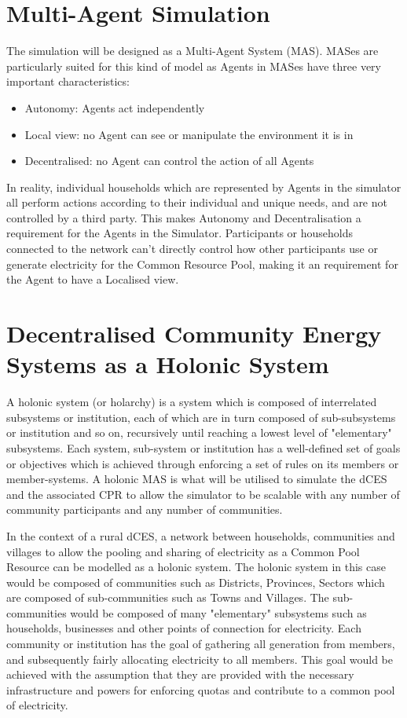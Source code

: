 \section*{Multi-Agent Simulation}
The simulation will be designed as a Multi-Agent System (MAS). MASes are particularly suited for this kind of model as Agents in MASes have three very important characteristics:
\begin{itemize}
	\item Autonomy: Agents act independently
	\item Local view: no Agent can see or manipulate the environment it is in
	\item Decentralised: no Agent can control the action of all Agents
\end{itemize}
In reality, individual households which are represented by Agents in the simulator all perform actions according to their individual and unique needs, and are not controlled by a third party. This makes Autonomy and Decentralisation a requirement for the Agents in the Simulator. Participants or households connected to the network can't directly control how other participants use or generate electricity for the Common Resource Pool, making it an requirement for the Agent to have a Localised view. 

\section*{Decentralised Community Energy Systems as a Holonic System}
A holonic system (or holarchy) is a system which is composed of interrelated subsystems or institution, each of which are in turn composed of sub-subsystems  or institution and so on, recursively until reaching a lowest level of "elementary" subsystems. Each system, sub-system or institution has a well-defined set of goals or objectives which is achieved through enforcing a set of rules on its members or member-systems\cite{Pitt:Holonic_Institutions}. A holonic MAS is what will be utilised to simulate the dCES and the associated CPR to allow the simulator to be scalable with any number of community participants and any number of communities. 

In the context of a rural dCES, a network between households, communities and villages to allow the pooling and sharing of electricity as a Common Pool Resource can be modelled as a holonic system. The holonic system in this case would be composed of communities such as Districts, Provinces, Sectors which are composed of sub-communities such as Towns and Villages. The sub-communities would be composed of many "elementary" subsystems such as households, businesses and other points of connection for electricity. Each community or institution has the goal of gathering all generation from members, and subsequently fairly allocating electricity to all members. This goal would be achieved with the assumption that they are provided with the necessary infrastructure and powers for enforcing quotas and contribute to a common pool of electricity.


